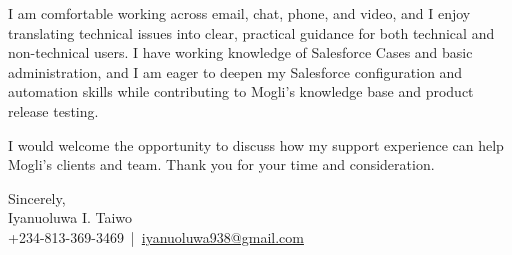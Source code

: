 \documentclass[a4paper, 12pt]{article}
\begin{document}
	I am comfortable working across email, chat, phone, and video, and I enjoy
	translating technical issues into clear, practical guidance for both technical
	and non-technical users. I have working knowledge of Salesforce Cases and basic
	administration, and I am eager to deepen my Salesforce configuration and
	automation skills while contributing to Mogli's knowledge base and product
	release testing.

	I would welcome the opportunity to discuss how my support experience can help
	Mogli's clients and team. Thank you for your time and consideration.

	\vspace{10pt}

	\noindent
	Sincerely,\\ Iyanuoluwa I. Taiwo\\ +234-813-369-3469 \,|\, \href{mailto:iyanuoluwa938@gmail.com}{iyanuoluwa938@gmail.com}
\end{document}
